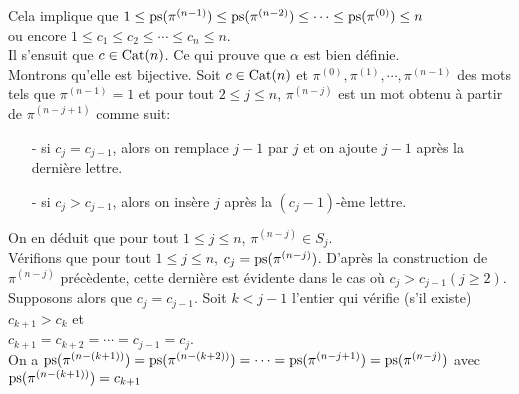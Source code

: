 Cela implique que $1\leq \begin{rm}ps\end{rm}(\pi^{(n-1)}) \leq \begin{rm}ps\end{rm}(\pi^{(n-2)}) \leq \cdots \leq \begin{rm}ps\end{rm}(\pi^{(0)})\leq n$\\ ou encore $1\leq c_{1}\leq c_{2}\leq \cdots \leq c_{n}\leq n$.\\
Il s'ensuit que  $c\in \begin{rm}Cat\end{rm}(n)$. Ce qui prouve que $\alpha$ est bien définie.\vspace{10pt}\\
Montrons qu'elle est bijective. Soit $c\in \begin{rm}Cat\end{rm}(n)$ et $\pi^{(0)}, \pi^{(1)}, \cdots, \pi^{(n-1)}$ des mots tels que $\pi^{(n-1)}=1$ et pour tout $2 \leq j \leq n$, $\pi^{(n-j)}$ est un mot obtenu à partir de $\pi^{(n-j+1)}$ comme suit:
\begin{itemize}
	\item [-] si $c_{j}=c_{j-1}$, alors on remplace $j-1$ par $j$ et on ajoute $j-1$ après la dernière lettre.
	\item [-] si $c_{j}>c_{j-1}$, alors on insère $j$ après la $(c_{j}-1)$-ème lettre.
\end{itemize}
On en déduit que pour tout $1\leq j \leq n$, $\pi^{(n-j)}\in S_{j}$.\vspace{7pt}\\
Vérifions que pour tout $1 \leq j \leq n$, $c_{j} = \begin{rm}ps\end{rm}(\pi^{(n-j)})$. D'après la construction de $\pi^{(n-j)}$ précèdente, cette dernière est  évidente dans le cas où $c_{j}> c_{j-1} (j\geq 2)$.
Supposons alors que $c_{j}=c_{j-1}$.
Soit $k<j-1$ l'entier qui vérifie (s'il existe) $c_{k+1}>c_{k}$ et \\$c_{k+1}=c_{k+2}=\cdots =c_{j-1}=c_{j}$. \\
On a $\begin{rm}ps\end{rm}(\pi^{(n-(k+1))}) = \begin{rm}ps\end{rm}(\pi^{(n-(k+2))}) = \cdots  = \begin{rm}ps\end{rm}(\pi^{(n-j+1)})= \begin{rm}ps\end{rm}(\pi^{(n-j)})$ avec \\ $\begin{rm}ps\end{rm}(\pi^{(n-(k+1))})=c_{k+1}$\\
